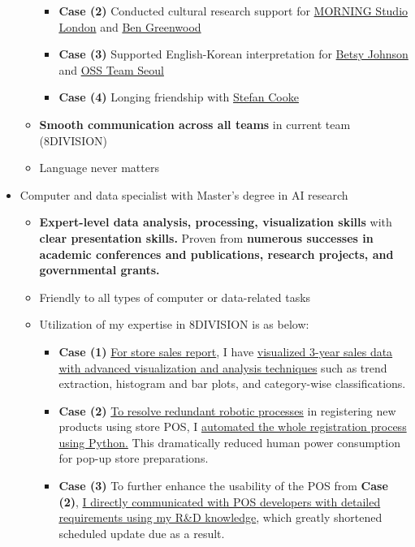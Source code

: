 \documentclass[a4paper,10pt]{extarticle}
\begin{document}
\begin{itemize}
\begin{itemize}
\begin{itemize}
			            \item \textbf{Case (2)} Conducted cultural research support for \href{https://www.instagram.com/morning.fyi/}{MORNING Studio London} and \href{https://www.instagram.com/bengreenie15}{Ben Greenwood}
			            \item \textbf{Case (3)} Supported English-Korean interpretation for \href{https://www.instagram.com/betsyjohnson_/}{Betsy Johnson} and \href{https://www.instagram.com/ourspecialsupport/}{OSS Team Seoul}
			            \item \textbf{Case (4)} Longing friendship with \href{https://www.instagram.com/stefan_cooke/}{Stefan Cooke}
		            \end{itemize}
		      \item \textbf{Smooth communication across all teams} in current team (8DIVISION)
		      \item Language never matters
	      \end{itemize}
	\item Computer and data specialist with Master's degree in AI research
	      \begin{itemize}
		      \item \textbf{Expert-level data analysis, processing, visualization skills} with \textbf{clear presentation skills.} Proven from \textbf{numerous successes in academic conferences and publications, research projects, and governmental grants.}
		      \item Friendly to all types of computer or data-related tasks
		      \item Utilization of my expertise in 8DIVISION is as below:
		            \begin{itemize}
			            \item \textbf{Case (1)} \ul{For store sales report}, I have \ul{visualized 3-year sales data with advanced visualization and analysis techniques} such as trend extraction, histogram and bar plots, and category-wise classifications.
			            \item \textbf{Case (2)} \ul{To resolve redundant robotic processes} in registering new products using store POS, I \ul{automated the whole registration process using Python.} This dramatically reduced human power consumption for pop-up store preparations.
			            \item \textbf{Case (3)} To further enhance the usability of the POS from \textbf{Case (2)}, \ul{I directly communicated with POS developers with detailed requirements using my R\&D knowledge}, which greatly shortened scheduled update due as a result.

\end{itemize}
\end{itemize}
\end{itemize}
\end{document}
